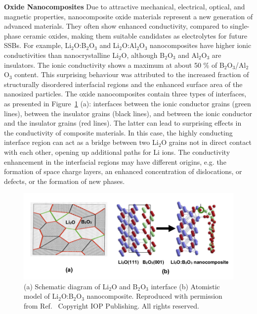 \documentclass[../main.tex]{subfiles}
\begin{document}
\textbf{Oxide Nanocomposites} Due to attractive mechanical, electrical, optical, and magnetic properties, nanocomposite oxide materials represent a new generation of advanced materials.\cite{uvarov2011,Heitjans_2003} They often show enhanced conductivity, compared to single-phase ceramic oxides, making them suitable candidates as electrolytes for future SSBs. For example, Li$_2$O:B$_2$O$_3$\cite{Heitjans_2003,Indris2000,Indris2002} and Li$_2$O:Al$_2$O$_3$ nanocomposites\cite{B300908D} have higher ionic conductivities than nanocrystalline Li$_2$O, although B$_2$O$_3$ and Al$_2$O$_3$ are insulators. The ionic conductivity shows a maximum at about 50 \% of B$_2$O$_3$/Al$_2$O$_3$ content. This surprising behaviour was attributed to the increased fraction of structurally disordered interfacial regions and the enhanced surface area of the nanosized particles.\cite{Heitjans_2003} The oxide nanocomposites contain three types of interfaces, as presented in Figure~\ref{fig:LBO} (a): interfaces between the ionic conductor grains (green lines), between the insulator grains (black lines), and between the ionic conductor and the insulator grains (red lines). The latter can lead to surprising effects in the conductivity of composite materials. In this case, the highly conducting interface region can act as a bridge between two Li$_2$O grains not in direct contact with each other, opening up additional paths for Li ions. The conductivity enhancement in the interfacial regions may have different origins, e.g. the formation of space charge layers, an enhanced concentration of dislocations, or defects, or the formation of new phases.

\begin{figure}
    \centering
    \includegraphics[scale=1]{figures/Islam-Fig-Li2O-B2O3.png}
    \caption{(a) Schematic diagram of Li$_2$O and B$_2$O$_3$ interface (b) Atomistic model of Li$_2$O:B$_2$O$_3$ nanocomposite. Reproduced with permission from Ref.~ Copyright IOP Publishing. All rights reserved.}
    \label{fig:LBO}
\end{figure}
\end{document}

